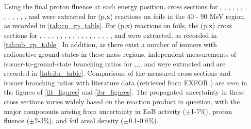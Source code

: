 \documentclass[3p]{elsarticle}
\begin{document}
Using the final proton fluence at each energy position, cross sections for  ,  , , , , , , ,  , , , , , and  were extracted for (p,x) reactions  on  foils in the 40 - 90 MeV region, as recorded in \autoref{tab:cu_rp_table}.
For  (p,x) reactions on  foils, the (p,x) cross sections for , , , , , , , , , , , , , , , , , , and  were extracted, as recorded in \autoref{tab:nb_rp_table}.
In addition, as there exist a number of isomers with radioactive ground states in these mass regions,  independent measurements of isomer-to-ground-state branching ratios for ,,,, and  were  extracted and are recorded in \autoref{tab:ibr_table}.
Comparisons  of the measured cross sections and isomer branching ratios with literature data (retrieved from EXFOR \cite{Otuka2014272}) are seen in the figures of \ref{fit_figures} and \ref{ibr_figures}.
The propagated uncertainty in these cross sections varies widely based on the reaction product in question, with the major components  arising from uncertainty in EoB activity ($\pm$1-7\%), proton fluence ($\pm$2-3\%), and foil areal density ($\pm$0.1-0.6\%).
\end{document}
